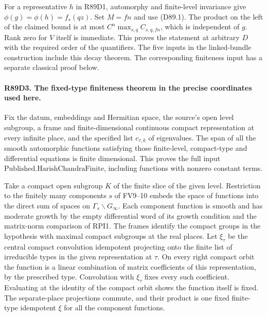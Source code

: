 For a representative $h$ in R89D1, automorphy and finite-level
invariance give $\phi(g)=\phi(h)=f_s(qz)$. Set $M=fn$ and use
(D89.1). The product on the left of the claimed bound is at most
$C^n\max_{s,q} C_{s,q,fn}$, which is independent of $g$. Rank zero
for $V$ itself is immediate. This proves the statement at arbitrary
$D$ with the required order of the quantifiers. The five inputs in the
linked-bundle construction include this decay theorem. The corresponding
finiteness input has a separate classical proof below.

\paragraph{R89D3. The fixed-type finiteness theorem in the precise coordinates used here.}
Fix the datum, embeddings and Hermitian space, the source's open
level subgroup, a frame and finite-dimensional continuous compact
representation at every infinite place, and the specified list
$c_{\tau,k}$ of eigenvalues. The span of all the smooth automorphic
functions satisfying those finite-level, compact-type and differential
equations is finite dimensional. This proves the full input
$\mathrm{Published.HarishChandraFinite}$, including functions with
nonzero constant terms.

Take a compact open subgroup $K$ of the finite slice of the given
level. Restriction to the finitely many components $s$ of FV9--10
embeds the space of functions into the direct sum of spaces on
$\Gamma_s\backslash G_\infty$. Each component function is smooth
and has moderate growth by the empty differential word of its
growth condition and the matrix-norm comparison of RPI1. The
frames identify the compact groups in the hypothesis with maximal
compact subgroups at the real places. Let $\xi_\tau$ be the central
compact convolution idempotent projecting onto the finite list of
irreducible types in the given representation at $\tau$. On every
right compact orbit the function is a linear combination of matrix
coefficients of this representation, by the prescribed type.
Convolution with $\xi_\tau$ fixes every such coefficient. Evaluating
at the identity of the compact orbit shows the function itself is fixed.
The separate-place projections commute, and their product is one
fixed finite-type idempotent $\xi$ for all the component functions.

